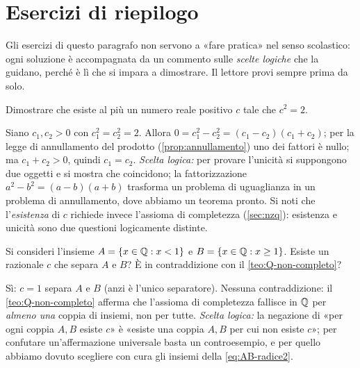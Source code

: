 \section{Esercizi di riepilogo}
\label{sec:esercizi-cap1}

Gli esercizi di questo paragrafo non servono a «fare pratica» nel senso scolastico: ogni
soluzione è accompagnata da un commento sulle \emph{scelte logiche} che la guidano,
perché è lì che si impara a dimostrare. Il lettore provi sempre prima da solo.

\begin{esercizio}
Dimostrare che esiste al più un numero reale positivo $c$ tale che $c^{2}=2$.
\begin{soluzione}
Siano $c_{1},c_{2}>0$ con $c_{1}^{2}=c_{2}^{2}=2$. Allora
$0=c_{1}^{2}-c_{2}^{2}=(c_{1}-c_{2})(c_{1}+c_{2})$; per la legge di annullamento del
prodotto (\cref{prop:annullamento}) uno dei fattori è nullo; ma $c_{1}+c_{2}>0$, quindi
$c_{1}=c_{2}$. \emph{Scelta logica:} per provare l'unicità si suppongono due oggetti e si
mostra che coincidono; la fattorizzazione $a^{2}-b^{2}=(a-b)(a+b)$ trasforma un
problema di uguaglianza in un problema di annullamento, dove abbiamo un teorema
pronto. Si noti che l'\emph{esistenza} di $c$ richiede invece l'assioma di completezza
(\cref{sec:nzq}): esistenza e unicità sono due questioni logicamente distinte.
\end{soluzione}
\end{esercizio}

\begin{esercizio}
Si consideri l'insieme $A=\{x\in\mathbb{Q} : x<1\}$ e $B=\{x\in\mathbb{Q} : x\ge1\}$. Esiste un
razionale $c$ che separa $A$ e $B$? È in contraddizione con il
\cref{teo:Q-non-completo}?
\begin{soluzione}
Sì: $c=1$ separa $A$ e $B$ (anzi è l'unico separatore). Nessuna contraddizione: il
\cref{teo:Q-non-completo} afferma che l'assioma di completezza fallisce in $\mathbb{Q}$ per
\emph{almeno una} coppia di insiemi, non per tutte. \emph{Scelta logica:} la negazione di
«per ogni coppia $A,B$ esiste $c$» è «esiste una coppia $A,B$ per cui non esiste $c$»;
per confutare un'affermazione universale basta un controesempio, e per quello abbiamo
dovuto scegliere con cura gli insiemi della \eqref{eq:AB-radice2}.
\end{soluzione}
\end{esercizio}


